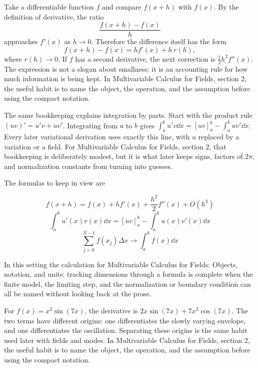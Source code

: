 Take a differentiable function \(f\) and compare \(f(x+h)\) with \(f(x)\).  By the definition of derivative, the ratio
\[
  \frac{f(x+h)-f(x)}{h}
\]
approaches \(f'(x)\) as \(h\to0\).  Therefore the difference itself has the form
\[
  f(x+h)-f(x)=hf'(x)+h\,r(h),
\]
where \(r(h)\to0\).  If \(f\) has a second derivative, the next correction is \(\frac12h^2f''(x)\).  The expression is not a slogan about smallness; it is an accounting rule for how much information is being kept.  In Multivariable Calculus for Fields, section 2, the useful habit is to name the object, the operation, and the assumption before using the compact notation.

The same bookkeeping explains integration by parts.  Start with the product rule \((uv)'=u'v+uv'\).  Integrating from \(a\) to \(b\) gives \(\int_a^b u'v\dd x=[uv]_a^b-\int_a^buv'\dd x\).  Every later variational derivation uses exactly this line, with \(u\) replaced by a variation or a field.  For Multivariable Calculus for Fields, section 2, that bookkeeping is deliberately modest, but it is what later keeps signs, factors of \(2\pi\), and normalization constants from turning into guesses.

The formulas to keep in view are

\[
  f(x+h)=f(x)+hf'(x)+\frac{h^2}{2}f''(x)+O(h^3)
\]
\[
  \int_a^b u'(x)v(x)\dd x=[uv]_a^b-\int_a^b u(x)v'(x)\dd x
\]
\[
  \sum_{j=0}^{N-1}f(x_j)\Delta x\longrightarrow \int_a^b f(x)\dd x
\]

In this setting the calculation for Multivariable Calculus for Fields: Objects, notation, and units: tracking dimensions through a formula is complete when the finite model, the limiting step, and the normalization or boundary condition can all be named without looking back at the prose.




\begin{example}
For \(f(x)=x^2\sin(7x)\), the derivative is \(2x\sin(7x)+7x^2\cos(7x)\).  The two terms have different origins: one differentiates the slowly varying envelope, and one differentiates the oscillation.  Separating these origins is the same habit used later with fields and modes.  In Multivariable Calculus for Fields, section 2, the useful habit is to name the object, the operation, and the assumption before using the compact notation.
\end{example}



